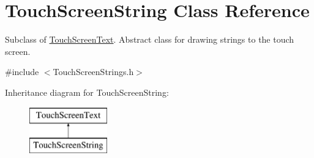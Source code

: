 \hypertarget{class_touch_screen_string}{\section{Touch\+Screen\+String Class Reference}
\label{class_touch_screen_string}
}


Subclass of \hyperlink{class_touch_screen_text}{Touch\+Screen\+Text}. Abstract class for drawing strings to the touch screen.  




{\ttfamily \#include $<$Touch\+Screen\+Strings.\+h$>$}

Inheritance diagram for Touch\+Screen\+String\+:\begin{figure}[H]
\begin{center}
\leavevmode
\includegraphics[height=2.000000cm]{class_touch_screen_string}
\end{center}
\end{figure}
